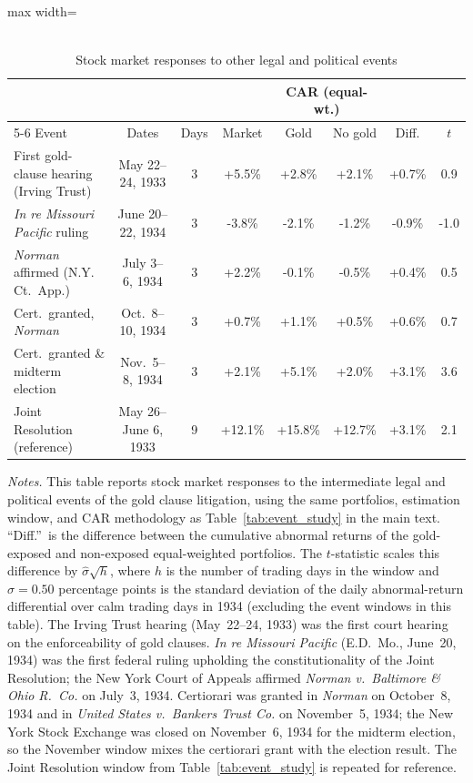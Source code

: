 \begin{table}[htbp]
\centering
\caption{\\ Stock market responses to other legal and political events}
\label{tab:other_events}
\footnotesize
\setlength{\tabcolsep}{4pt}
\medskip
\begin{adjustbox}{max width=\textwidth}
\begin{tabular}{lccccccc}
\toprule
 & & & & \multicolumn{2}{c}{CAR (equal-wt.)} & & \\
\cmidrule(lr){5-6}
Event & Dates & Days & Market & Gold & No gold & Diff. & $t$ \\
\midrule
First gold-clause hearing (Irving Trust) & May 22--24, 1933 & 3 & +5.5\% & +2.8\% & +2.1\% & +0.7\% & 0.9 \\
\textit{In re Missouri Pacific} ruling & June 20--22, 1934 & 3 & -3.8\% & -2.1\% & -1.2\% & -0.9\% & -1.0 \\
\textit{Norman} affirmed (N.Y. Ct.\ App.) & July 3--6, 1934 & 3 & +2.2\% & -0.1\% & -0.5\% & +0.4\% & 0.5 \\
Cert.\ granted, \textit{Norman} & Oct.\ 8--10, 1934 & 3 & +0.7\% & +1.1\% & +0.5\% & +0.6\% & 0.7 \\
Cert.\ granted \& midterm election & Nov.\ 5--8, 1934 & 3 & +2.1\% & +5.1\% & +2.0\% & +3.1\% & 3.6 \\
\midrule
Joint Resolution (reference) & May 26--June 6, 1933 & 9 & +12.1\% & +15.8\% & +12.7\% & +3.1\% & 2.1 \\
\bottomrule
\end{tabular}
\end{adjustbox}
\medskip
\begin{minipage}{0.95\textwidth}\footnotesize \textit{Notes.} This table reports stock market responses to the intermediate legal and political events of the gold clause litigation, using the same portfolios, estimation window, and CAR methodology as Table~\ref{tab:event_study} in the main text. ``Diff.''\ is the difference between the cumulative abnormal returns of the gold-exposed and non-exposed equal-weighted portfolios. The $t$-statistic scales this difference by $\hat\sigma\sqrt{h}$, where $h$ is the number of trading days in the window and $\hat\sigma = 0.50$ percentage points is the standard deviation of the daily abnormal-return differential over calm trading days in 1934 (excluding the event windows in this table). The Irving Trust hearing (May~22--24, 1933) was the first court hearing on the enforceability of gold clauses. \textit{In re Missouri Pacific} (E.D.~Mo., June~20, 1934) was the first federal ruling upholding the constitutionality of the Joint Resolution; the New York Court of Appeals affirmed \textit{Norman v.\ Baltimore \& Ohio R.~Co.} on July~3, 1934. Certiorari was granted in \textit{Norman} on October~8, 1934 and in \textit{United States v.\ Bankers Trust Co.} on November~5, 1934; the New York Stock Exchange was closed on November~6, 1934 for the midterm election, so the November window mixes the certiorari grant with the election result. The Joint Resolution window from Table~\ref{tab:event_study} is repeated for reference.\end{minipage}
\end{table}
